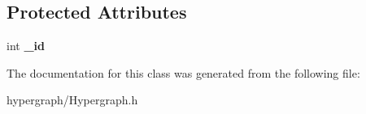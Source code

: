 \subsection*{Protected Attributes}
\begin{DoxyCompactItemize}
\item 
\hypertarget{classScarab_1_1Hyperedge_aa211bdbc28c7c82f180fcd1faa2cc7a9}{
int {\bfseries \_\-id}}
\label{classScarab_1_1Hyperedge_aa211bdbc28c7c82f180fcd1faa2cc7a9}

\end{DoxyCompactItemize}


The documentation for this class was generated from the following file:\begin{DoxyCompactItemize}
\item 
hypergraph/Hypergraph.h\end{DoxyCompactItemize}
